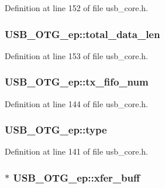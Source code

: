 Definition at line 152 of file usb\-\_\-core.\-h.

\hypertarget{struct_u_s_b___o_t_g__ep_a205c3a0a7050751fe9c96fc734ba1d97}{
\subsubsection[{total\-\_\-data\-\_\-len}]{ U\-S\-B\-\_\-\-O\-T\-G\-\_\-ep\-::total\-\_\-data\-\_\-len}}\label{struct_u_s_b___o_t_g__ep_a205c3a0a7050751fe9c96fc734ba1d97}


Definition at line 153 of file usb\-\_\-core.\-h.

\hypertarget{struct_u_s_b___o_t_g__ep_afcd3fbb769429805d98bcfc574655df5}{
\subsubsection[{tx\-\_\-fifo\-\_\-num}]{ U\-S\-B\-\_\-\-O\-T\-G\-\_\-ep\-::tx\-\_\-fifo\-\_\-num}}\label{struct_u_s_b___o_t_g__ep_afcd3fbb769429805d98bcfc574655df5}


Definition at line 144 of file usb\-\_\-core.\-h.

\hypertarget{struct_u_s_b___o_t_g__ep_a8bd2a2f083f2bab19edffccf6e1b07db}{
\subsubsection[{type}]{ U\-S\-B\-\_\-\-O\-T\-G\-\_\-ep\-::type}}\label{struct_u_s_b___o_t_g__ep_a8bd2a2f083f2bab19edffccf6e1b07db}


Definition at line 141 of file usb\-\_\-core.\-h.

\hypertarget{struct_u_s_b___o_t_g__ep_af4a3c53a97b4da1a69cab2fb7101a656}{
\subsubsection[{xfer\-\_\-buff}]{$\ast$ U\-S\-B\-\_\-\-O\-T\-G\-\_\-ep\-::xfer\-\_\-buff}}\label{struct_u_s_b___o_t_g__ep_af4a3c53a97b4da1a69cab2fb7101a656}


